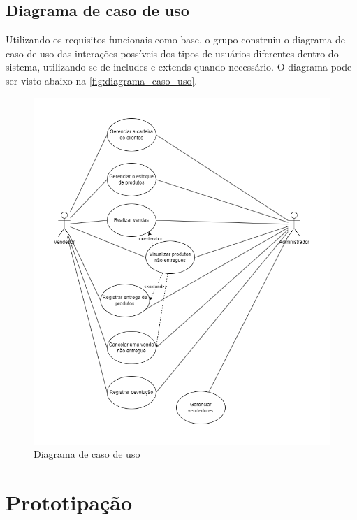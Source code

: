 \documentclass[serif, english, brazilian, oneside]{uffstex}
\begin{document}
\subsection{Diagrama de caso de uso}

Utilizando os requisitos funcionais como base, o grupo construiu o diagrama de caso de uso das interações possíveis dos tipos de usuários diferentes dentro do sistema, utilizando-se de includes e extends quando necessário. O diagrama pode ser visto abaixo na \autoref{fig:diagrama_caso_uso}.

\begin{figure}[!htpb]
    \centering
    \caption{Diagrama de caso de uso}
    \label{fig:diagrama_caso_uso}
    \includegraphics[width=\linewidth]{imagens/diagrama_caso_uso.png}
\end{figure}

\newpage

\section{Prototipação}
\end{document}
